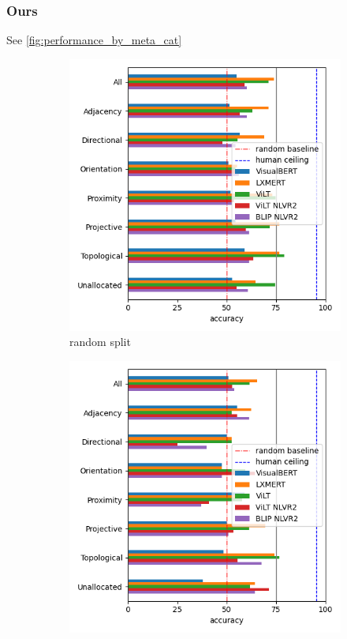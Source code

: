 \subsubsection{Ours}

See \cref{fig:performance_by_meta_cat}

\begin{figure}[ht]
    \centering
    \begin{subfigure}[b]{0.49\linewidth}
    \centering
    \includegraphics[width=\linewidth]{images/visual-spatial-reasoning/performance_rel_meta_cat_random.png}
    \caption{random split}
     \end{subfigure}
     \begin{subfigure}[b]{0.49\linewidth}
         \centering
    \includegraphics[width=\linewidth]{images/visual-spatial-reasoning/performance_rel_meta_cat_zeroshot.png}

\end{subfigure}
\end{figure}
